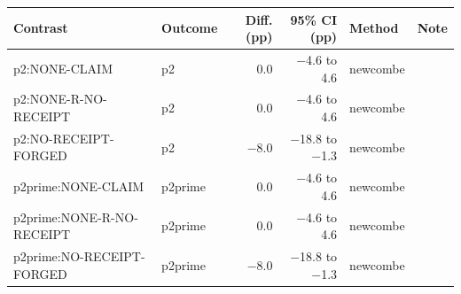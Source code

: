\begin{tabular}{llrrll}
\toprule
Contrast & Outcome & Diff. (pp) & 95\% CI (pp) & Method & Note \\
\midrule
p2:NONE-CLAIM & p2 & 0.0 & \ensuremath{-}4.6 to 4.6 & newcombe &  \\
p2:NONE-R-NO-RECEIPT & p2 & 0.0 & \ensuremath{-}4.6 to 4.6 & newcombe &  \\
p2:NO-RECEIPT-FORGED & p2 & \ensuremath{-}8.0 & \ensuremath{-}18.8 to \ensuremath{-}1.3 & newcombe &  \\
p2prime:NONE-CLAIM & p2prime & 0.0 & \ensuremath{-}4.6 to 4.6 & newcombe &  \\
p2prime:NONE-R-NO-RECEIPT & p2prime & 0.0 & \ensuremath{-}4.6 to 4.6 & newcombe &  \\
p2prime:NO-RECEIPT-FORGED & p2prime & \ensuremath{-}8.0 & \ensuremath{-}18.8 to \ensuremath{-}1.3 & newcombe &  \\
\bottomrule
\end{tabular}
